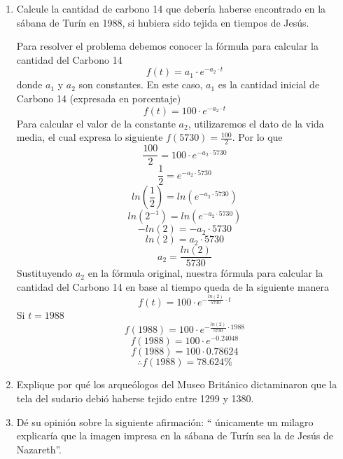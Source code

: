 \documentclass[12pt]{article}
\begin{document}
\begin{enumerate}	
\item Calcule la cantidad de carbono 14 que debería haberse encontrado en la sábana de Turín en 1988, si hubiera sido tejida en tiempos de Jesús.

Para resolver el problema debemos conocer la fórmula para calcular la cantidad del Carbono 14
\[
f(t)=a_1 \cdot e^{-a_2 \cdot t}
\]
donde $a_1$ y $a_2$ son constantes. En este caso, $a_1$ es la cantidad inicial de Carbono 14 (expresada en porcentaje)
\[
f(t)=100 \cdot e^{-a_2 \cdot t}
\]
Para calcular el valor de la constante $a_2$, utilizaremos el dato de la vida media, el cual expresa lo siguiente $f(5730)=\frac{100}{2}$. Por lo que
\[
\frac{100}{2}=100 \cdot e^{-a_2 \cdot 5730}
\]
\[
\frac{1}{2}=e^{-a_2 \cdot 5730}
\]
\[
ln(\frac{1}{2}) = ln ( e^{-a_2 \cdot 5730} )
\]
\[
ln(2^{-1}) = ln ( e^{-a_2 \cdot 5730} )
\]
\[
-ln(2) = -a_2 \cdot 5730
\]
\[
ln(2) = a_2 \cdot 5730
\]
\[
a_2 = \frac{ln(2)}{5730}
\]
Sustituyendo $a_2$ en la fórmula original, nuestra fórmula para calcular la cantidad del Carbono 14 en base al tiempo queda de la siguiente manera
\[
f(t)=100 \cdot e^{-\frac{ln(2)}{5730} \cdot t}
\]
Si $t=1988$
\[
f(1988)=100 \cdot e^{-\frac{ln(2)}{5730} \cdot 1988}
\]
\[
f(1988)=100 \cdot e^{-0.24048}
\]
\[
f(1988)=100 \cdot 0.78624
\]
\[
\therefore f(1988)=78.624\%
\]

\item Explique por qué los arqueólogos del Museo Británico dictaminaron que la tela del sudario debió haberse tejido entre 1299 y 1380.

\item Dé su opinión sobre la siguiente afirmación: “ únicamente un milagro explicaría que la imagen impresa en la sábana de Turín sea la de Jesús de Nazareth”.

\end{enumerate}

\clearpage
\end{document}

